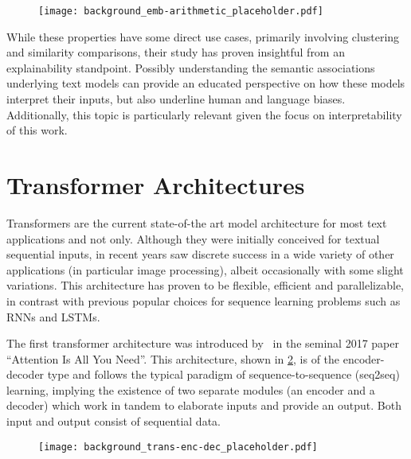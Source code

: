 \begin{figure}[t!]
    \centering
    \texttt{[image: background\_emb-arithmetic\_placeholder.pdf]}
    \caption{}
    \label{fig:background_emb-arithmetic}
\end{figure}

While these properties have some direct use cases, primarily involving clustering and similarity comparisons, their study has proven insightful from an explainability standpoint.
Possibly understanding the semantic associations underlying text models can provide an educated perspective on how these models interpret their inputs, but also underline human and language biases.
Additionally, this topic is particularly relevant given the focus on interpretability of this work.

\section{Transformer Architectures}

Transformers are the current state-of-the art model architecture for most text applications and not only.
Although they were initially conceived for textual sequential inputs, in recent years saw discrete success in a wide variety of other applications (in particular image processing), albeit occasionally with some slight variations.
This architecture has proven to be flexible, efficient and parallelizable, in contrast with previous popular choices for sequence learning problems such as RNNs and LSTMs.

The first transformer architecture was introduced by~\citet{vaswani2017} in the seminal 2017 paper ``Attention Is All You Need''.
This architecture, shown in \cref{fig:background_trans-enc-dec}, is of the encoder-decoder type and follows the typical paradigm of sequence-to-sequence (seq2seq) learning, implying the existence of two separate modules (an encoder and a decoder) which work in tandem to elaborate inputs and provide an output.
Both input and output consist of sequential data.

\begin{figure}[t!]
    \centering
    \texttt{[image: background\_trans-enc-dec\_placeholder.pdf]}
    \caption{}
    \label{fig:background_trans-enc-dec}
\end{figure}

